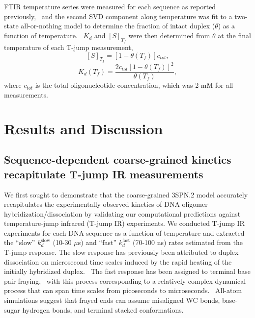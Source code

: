 \documentclass[journal=jpcbfk,manuscript=article]{achemso}
\begin{document}
FTIR temperature series were measured for each sequence as reported previously,~\citep{Sanstead2016} and the second SVD component along temperature was fit to a two-state all-or-nothing model to determine the fraction of intact duplex ($\theta$) as a function of temperature.~\citep{Marky1987CalculatingCurves} $K_d$ and $[S]_{T_f}$ were then determined from $\theta$ at the final temperature of each T-jump measurement,
	\begin{equation}\label{e3a}
	[S]_{T_f} = [1 - \theta(T_f)]c_{tot},
	\end{equation}
	\begin{equation}\label{e3b}
	K_d(T_f) = \frac{2c_{tot}[1 - \theta(T_f)]^2}{\theta(T_f)},
	\end{equation}
where $c_{tot}$ is the total oligonucleotide concentration, which was 2 mM for all measurements.



\section{\label{sec:Results}Results and Discussion}

\subsection{Sequence-dependent coarse-grained kinetics recapitulate T-jump IR measurements} \label{sec:time}


We first sought to demonstrate that the coarse-grained 3SPN.2 model accurately recapitulates the experimentally observed kinetics of DNA oligomer hybridization/dissociation by validating our computational predictions against temperature-jump infrared (T-jump IR) experiments. We conducted T-jump IR experiments for each DNA sequence as a function of temperature and extracted the ``slow'' $k_d^\mathrm{slow}$ (10-30 $\mu$s) and ``fast'' $k_d^\mathrm{fast}$ (70-100 ns) rates estimated from the T-jump response. The slow response has previously been attributed to duplex dissociation on microsecond time scales induced by the rapid heating of the initially hybridized duplex.~\citep{Sanstead2016, Sanstead2018DirectDehybridization} The fast response has been assigned to terminal base pair fraying,~\citep{Sanstead2016, Sanstead2018DirectDehybridization} with this process corresponding to a relatively complex dynamical process that can span time scales from picoseconds to microseconds.~\cite{Nonin1995TerminalFraying, Nikolova2012ProbingSimulations, Andreatta2006UltrafastHelix, Galindo-Murillo2015ConvergenceDGCACGAACGAACGAACGC} All-atom simulations suggest that frayed ends can assume misaligned WC bonds, base-sugar hydrogen bonds, and terminal stacked conformations.~\citep{Pinamonti2019TheModels, Zgarbova2014BaseRNA} 
\end{document}
